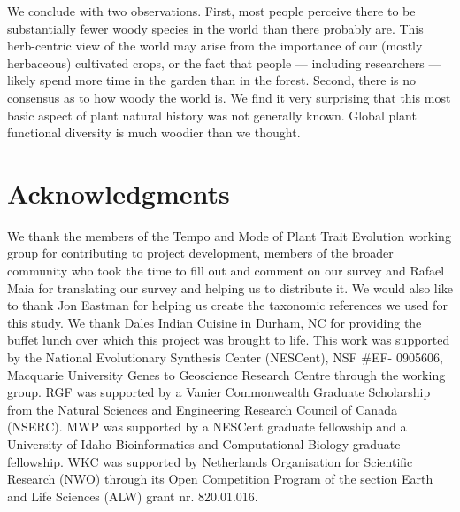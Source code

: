 \documentclass[12pt]{article}
\begin{document}
We conclude with two observations.
%
First, most people perceive there to be substantially fewer woody
species in the world than there probably are.  This herb-centric view
of the world may arise from the importance of our (mostly herbaceous)
cultivated crops, or the fact that people --- including researchers
--- likely spend more time in the garden than in the forest.
%
Second, there is no consensus as to how woody the world is.  We find
it very surprising that this most basic aspect of plant natural
history was not generally known.  Global plant functional diversity is
much woodier than we thought.

\section{Acknowledgments}

We thank the members of the Tempo and Mode of Plant Trait
Evolution working group for contributing to project development,
members of the broader community who took the time to fill out and
comment on our survey and Rafael Maia for translating our survey and
helping us to distribute it. We would also like to thank Jon Eastman for 
helping us create the taxonomic references we used for this study.
We thank Dales Indian Cuisine in Durham, NC for providing the buffet
lunch over which this project was brought to life.
%
This work was supported by the National Evolutionary Synthesis Center
(NESCent), NSF \#EF- 0905606, Macquarie University Genes to Geoscience
Research Centre through the working group.
%
RGF was supported by a Vanier Commonwealth Graduate Scholarship from
the Natural Sciences and Engineering Research Council of Canada
(NSERC).
MWP was supported by a NESCent graduate fellowship and a 
University of Idaho Bioinformatics and Computational Biology graduate fellowship.
%
WKC was supported by Netherlands Organisation for
Scientific Research (NWO) through its Open Competition Program of the
section Earth and Life Sciences (ALW) grant nr. 820.01.016.
\end{document}
